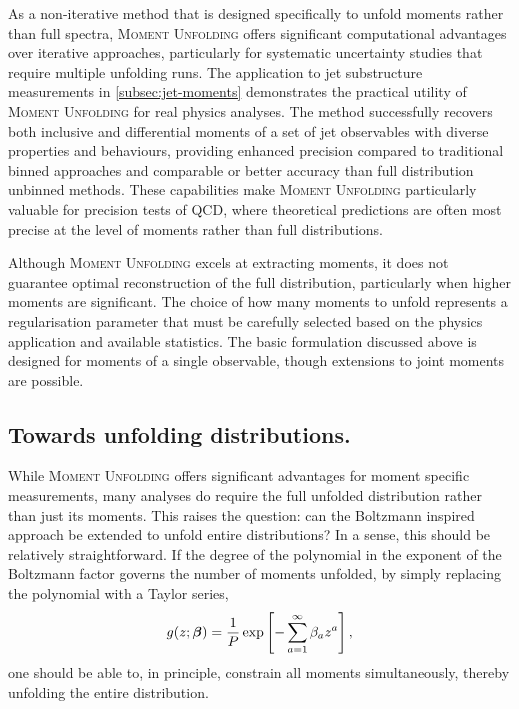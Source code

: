     As a non-iterative method that is designed specifically to unfold moments rather than full spectra, \textsc{Moment Unfolding} offers significant computational advantages over iterative approaches, particularly for systematic uncertainty studies that require multiple unfolding runs.
    The application to jet substructure measurements in \cref{subsec:jet-moments} demonstrates the practical utility of \textsc{Moment Unfolding} for real physics analyses.
    The method successfully recovers both inclusive and differential moments of a set of jet observables with diverse properties and behaviours, providing enhanced precision compared to traditional binned approaches and comparable or better accuracy than full distribution unbinned methods.
    These capabilities make \textsc{Moment Unfolding} particularly valuable for precision tests of QCD, where theoretical predictions are often most precise at the level of moments rather than full distributions.
    
    Although \textsc{Moment Unfolding} excels at extracting moments, it does not guarantee optimal reconstruction of the full distribution, particularly when higher moments are significant.
    The choice of how many moments to unfold represents a regularisation parameter that must be carefully selected based on the physics application and available statistics.
    The basic formulation discussed above is designed for moments of a single observable, though extensions to joint moments are possible.
    \subsection{Towards unfolding distributions.}
        While \textsc{\textsc{Moment Unfolding}} offers significant advantages for moment specific measurements, many analyses do require the full unfolded distribution rather than just its moments.
        This raises the question: can the Boltzmann inspired approach be extended to unfold entire distributions?
        In a sense, this should be relatively straightforward.
        If the degree of the polynomial in the exponent of the Boltzmann factor governs the number of moments unfolded, by simply replacing the polynomial with a Taylor series,
        \[
            g(z;\vb*\beta) = \frac{1}{P}\exp\left[-\sum_{a=1}^{\infty}\beta_a z^a\right],
        \]
        one should be able to, in principle, constrain all moments simultaneously, thereby unfolding the entire distribution.
        
